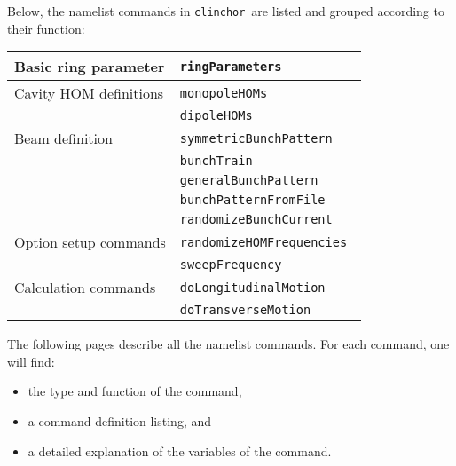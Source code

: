 \documentclass[11pt]{article}
\newcommand{\clinchor}{{\tt clinchor}}
\begin{document}
Below, the namelist commands in \clinchor\ are listed and grouped according to their function:
\begin{center}
\begin{tabular}{ll} \toprule
Basic ring parameter            & \tt ringParameters               \\ \hline
Cavity HOM definitions          & \tt monopoleHOMs                 \\ 
                                & \tt dipoleHOMs                   \\ \hline
Beam definition                 & \tt symmetricBunchPattern       \\ 
                                & \tt bunchTrain                   \\
                                & \tt generalBunchPattern         \\ 
                                & \tt bunchPatternFromFile         \\
                                & \tt randomizeBunchCurrent         \\ \hline
Option setup commands           & \tt randomizeHOMFrequencies         \\ 
                                & \tt sweepFrequency               \\ \hline
Calculation commands             & \tt doLongitudinalMotion        \\ 
                                & \tt doTransverseMotion          \\ \bottomrule
\end{tabular}
\end{center}

The following pages describe all the namelist commands. For each
command, one will find:
\begin{itemize}
\item the type and function of the command,
\item a command definition listing, and
\item a detailed explanation of the variables of the command.
\end{itemize}
\end{document}
